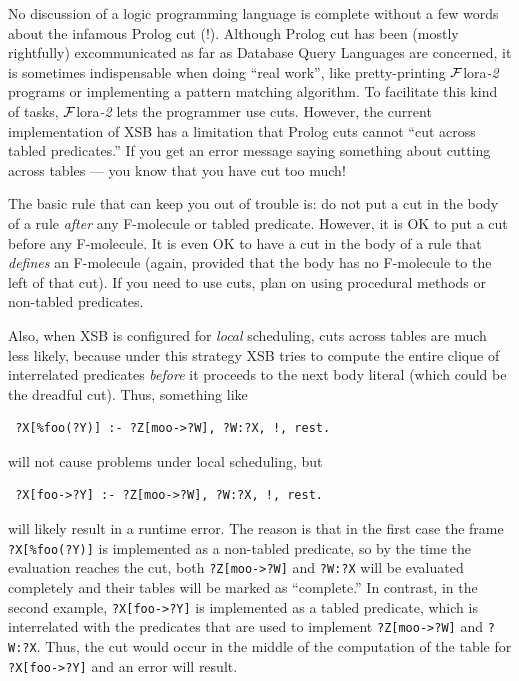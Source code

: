 \documentclass[11pt]{article}
\newcommand{\FLORA}{{\mbox{\sc ${\cal F}${lora}\rm\emph{-2}}}\xspace}
\begin{document}
\index{cut!in \FLORA}
No discussion of a logic programming language is complete without a few
words about the infamous Prolog cut (!). Although Prolog cut has been
(mostly rightfully) excommunicated as far as Database Query Languages are
concerned, it is sometimes indispensable when doing ``real work'', like
pretty-printing \FLORA programs or implementing a pattern matching
algorithm.  To facilitate this kind of tasks, \FLORA lets the programmer
use cuts.  However, the current implementation of XSB has a limitation that
Prolog cuts cannot ``cut across tabled predicates.''  If you get an error
message saying something about cutting across tables --- you know that
you have cut too much!

The basic rule that can keep you out of trouble is: do not put a cut in the
body of a rule \emph{after} any F-molecule or tabled 
predicate. However, it is OK to put a cut before any F-molecule. It is
even OK to have a cut in the body of a rule that \emph{defines} an
F-molecule (again, provided that the body has no F-molecule to the left of
that cut). If you need to use cuts, plan on using procedural methods or
non-tabled predicates.

Also, when XSB is configured for \emph{local} scheduling, cuts across
tables are much less likely, because under this strategy XSB tries to
compute the entire clique of interrelated predicates \emph{before} it
proceeds to the next body literal (which could be the dreadful cut).
Thus, something like
\begin{verbatim}
 ?X[%foo(?Y)] :- ?Z[moo->?W], ?W:?X, !, rest.  
\end{verbatim}
will not cause problems under local scheduling, but
\begin{verbatim}
 ?X[foo->?Y] :- ?Z[moo->?W], ?W:?X, !, rest.  
\end{verbatim}
will likely result in a runtime error. The reason is that in the first case
the frame \verb|?X[%foo(?Y)]| is implemented as a non-tabled predicate, so
by the time the evaluation reaches the cut, both \verb|?Z[moo->?W]| and 
{\tt ?W:?X} will be evaluated completely and their tables will be marked as
``complete.'' In contrast, in the second example, \verb|?X[foo->?Y]| is
implemented as a tabled predicate, which is interrelated with the
predicates that are used to implement \verb|?Z[moo->?W]| and 
{\tt ?W:?X}. Thus, the cut would occur in the middle of the computation of
the table for \verb|?X[foo->?Y]| and an error will result.
\end{document}
